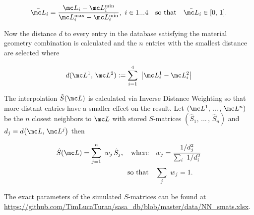 \begin{equation}
    \bar{\mc L}_i = \frac{\mc L_i - \mc L_i^\s{min}}{\mc L_i^\s{max} - \mc L_i^\s{min}}
    , \  i \in 1 ... 4
    \qq{so that} \bar{\mc L}_i \in [0, \, 1].
\end{equation}

\noindent
Now the distance $d$ to every entry in the database satisfying the material geometry combination is calculated and the $n$ entries with the smallest distance are selected where

\begin{equation}
    d(\mc L^1, \, \mc L^2) := \sum_{i=1}^4 \ \qty|\mc L^1_i - \mc L^2_i|
\end{equation}

\noindent
The interpolation $\hat{S}(\mc L)$ is calculated via Inverse Distance Weighting \cite{Shepard1968} so that more distant entries have a smaller effect on the result. Let
$(\mc L^1, \, ... \, , \, \mc L^n)$ be the $n$ closest neighbors to $\mc L$ with stored $S$-matrices
$(\hat{S}_1, \, ... \, , \, \hat{S}_n)$
and
$d_j = d\qty(\mc L ,\, \mc L^j)$
then

\begin{equation}
\begin{aligned}
    \hat{S}(\mc L) = \sum_{j=1}^n \ w_j \, \hat{S}_j,
    \qq{where}&
    w_j = \frac{1 / d_j^2}{\sum_i \ 1 / d^2_i} \\
    \qq*{so that} 
    &\sum_j \ w_j = 1.
\end{aligned}
\end{equation}

The exact parameters of the simulated $S$-matrices can be found at
\url{https://github.com/TimLucaTuran/sasa_db/blob/master/data/NN_smats.xlsx}.